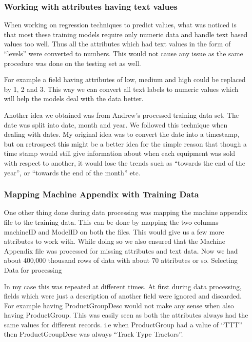 \documentclass[paper=a4, fontsize=11pt]{scrartcl}	%
\numberwithin{equation}{section}		%
\numberwithin{figure}{section}			%
\numberwithin{table}{section}				%
\begin{document}
\subsubsection{Working with attributes having text values}

When working on regression techniques to predict values, what was noticed is that most these training models require only numeric data and handle text based values too well. Thus all the attributes which had text values in the form of ``levels'' were converted to numbers. This would not cause any issue as the same procedure was done on the testing set as well.

For example a field having attributes of low, medium and high could be replaced by 1, 2 and 3. This way we can convert all text labels to numeric values which will help the models deal with the data better.

Another idea we obtained was from Andrew's processed training data set. The date was split into date, month and year. We followed this technique when dealing with dates. My original idea was to convert the date into a timestamp, but on retrospect this might be a better idea for the simple reason that though a time stamp would still give information about when each equipment was sold with respect to another, it would lose the trends such as ``towards the end of the year'', or ``towards the end of the month'' etc.

\subsubsection{Mapping Machine Appendix with Training Data}

One other thing done during data processing was mapping the machine appendix file to the training data. This can be done by mapping the two columns machineID and ModelID on both the files. This would give us a few more attributes to work with. While doing so we also ensured that the Machine Appendix file was processed for missing attributes and text data. Now we had about 400,000 thousand rows of data with about 70 attributes or so.
Selecting Data for processing

In my case this was repeated at different times. At first during data processing, fields which were just a description of another field were ignored and discarded. For example having ProductGroupDesc would not make any sense when also having ProductGroup. This was easily seen as both the attributes always had the same values for different records. i.e when ProductGroup had a value of ``TTT'' then ProductGroupDesc was always ``Track Type Tractors''.
\end{document}
